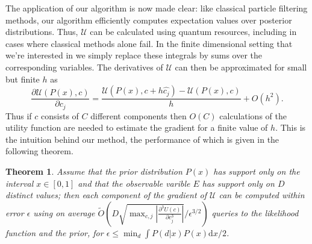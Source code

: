 \documentclass[aps,amsmath,onecolumn,amssymb,notitlepage]{revtex4-1}
\newtheorem{theorem}{Theorem}
\begin{document}
The application of our algorithm is now made clear: like classical particle
filtering methods, our algorithm efficiently computes expectation values over
posterior distributions. Thus, $\mathcal{U}$ can be calculated using quantum resources,
including in cases where classical methods alone fail.
In the finite dimensional setting that we're interested in we simply replace these integrals by sums over the corresponding variables.
The derivatives of $\mathcal{U}$ can then be approximated for small but finite $h$ as 
\begin{equation}
\frac{\partial \mathcal{U}(P(x),c)}{\partial c_j} = \frac{\mathcal{U}(P(x),c+h\hat{c_j})-\mathcal{U}(P(x),c)}{h} + O(h^2).
\end{equation}
Thus if $c$ consists of $C$ different components then $O(C)$ calculations of the utility function are needed to estimate the gradient for a finite value of $h$.
This is the intuition behind our method, the performance of which is given in the following theorem.
\begin{theorem}
Assume that the prior distribution $P(x)$ has support only on the interval $x\in [0,1]$ and that the observable varible $E$ has support only on $D$ distinct values; then each component of the gradient of $\mathcal{U}$ can be computed within error $\epsilon$ using on average $\tilde{O}\left(D\sqrt{\max_{c,j}\left|\frac{\partial^3 U(c)}{\partial c_j^3} \right|}/\epsilon^{3/2}\right)$ queries to the likelihood function and the prior, for $\epsilon \le \min_d \int P(d|x)P(x) \mathrm{d}x/2$.
\end{theorem}
\end{document}
